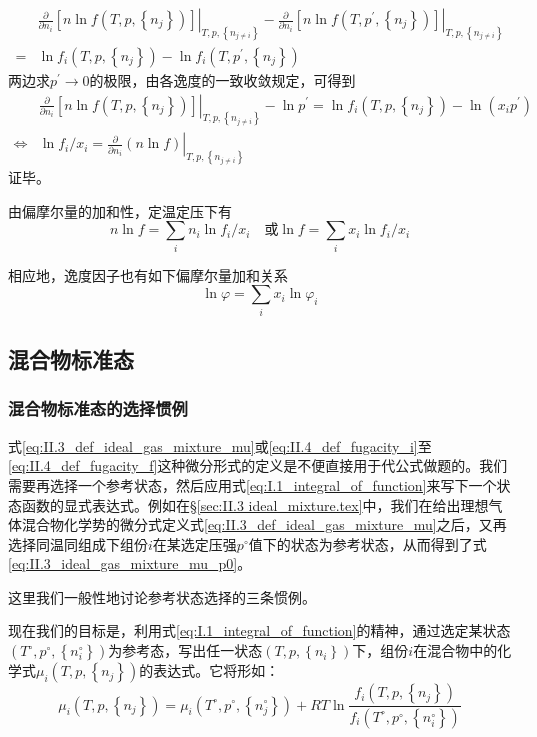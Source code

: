 \documentclass[main.tex]{subfiles}
\begin{document}
\begin{align*}
    & \left.\frac{\partial}{\partial n_i}\left[n\ln f\left(T,p,\left\{n_j\right\}\right)\right]\right|_{T,p,\left\{n_{j\neq i}\right\}}-\left.\frac{\partial}{\partial n_i}\left[n\ln f\left(T,p^\prime,\left\{n_j\right\}\right)\right]\right|_{T,p,\left\{n_{j\neq i}\right\}} \\
  = & \ln f_i\left(T,p,\left\{n_j\right\}\right)-\ln f_i\left(T,p^\prime,\left\{n_j\right\}\right)
\end{align*}
两边求$p^\prime\rightarrow 0$的极限，由各逸度的一致收敛规定，可得到
\begin{align*}
                  & \left.\frac{\partial}{\partial n_i}\left[n\ln f\left(T,p,\left\{n_j\right\}\right)\right]\right|_{T,p,\left\{n_{j\neq i}\right\}}-\ln p^\prime=\ln f_i\left(T,p,\left\{n_j\right\}\right)-\ln\left(x_ip^\prime\right) \\
  \Leftrightarrow & \ln f_i/x_i=\left.\frac{\partial}{\partial n_i}\left(n\ln f\right)\right|_{T,p,\left\{n_{j\neq i}\right\}}
\end{align*}
证毕。

由偏摩尔量的加和性，定温定压下有
\[n\ln f=\sum_i n_i\ln f_i/x_i\quad\text{或}\ln f=\sum_ix_i\ln f_i/x_i\]

相应地，逸度因子也有如下偏摩尔量加和关系
\[\ln \varphi=\sum_ix_i\ln\varphi_i\]

\subsection{混合物标准态}
\subsubsection{混合物标准态的选择惯例}
式\eqref{eq:II.3_def_ideal_gas_mixture_mu}或\eqref{eq:II.4_def_fugacity_i}至\eqref{eq:II.4_def_fugacity_f}这种微分形式的定义是不便直接用于代公式做题的。我们需要再选择一个参考状态，然后应用式\eqref{eq:I.1_integral_of_function}来写下一个状态函数的显式表达式。例如在\S\ref{sec:II.3 ideal_mixture.tex}中，我们在给出理想气体混合物化学势的微分式定义式\eqref{eq:II.3_def_ideal_gas_mixture_mu}之后，又再选择同温同组成下组份$i$在某选定压强$p^\circ$值下的状态为参考状态，从而得到了式\eqref{eq:II.3_ideal_gas_mixture_mu_p0}。

这里我们一般性地讨论参考状态选择的三条惯例。

现在我们的目标是，利用式\eqref{eq:I.1_integral_of_function}的精神，通过选定某状态$\left(T^\circ,p^\circ,\left\{n_i^\circ\right\}\right)$为参考态，写出任一状态$\left(T,p,\left\{n_i\right\}\right)$下，组份$i$在混合物中的化学式$\mu_i\left(T,p,\left\{n_j\right\}\right)$的表达式。它将形如：
\begin{equation*}
  \mu_i\left(T,p,\left\{n_j\right\}\right)=\mu_i\left(T^\circ,p^\circ,\left\{n_j^\circ\right\}\right)+RT\ln\frac{f_i\left(T,p,\left\{n_j\right\}\right)}{f_i\left(T^\circ,p^\circ,\left\{n_i^\circ\right\}\right)}
\end{equation*}
\end{document}
